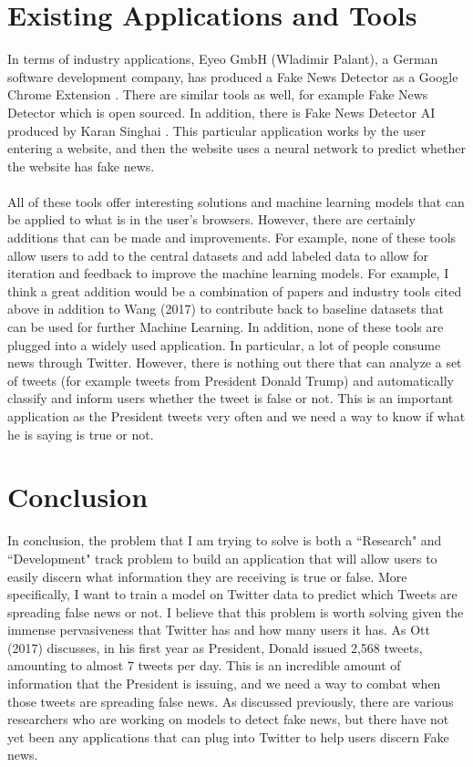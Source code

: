 \documentclass[12pt, final]{article}
\begin{document}
\section{Existing Applications and Tools}
In terms of industry applications, Eyeo GmbH (Wladimir Palant), a German software development company, has produced a Fake News Detector as a Google Chrome Extension \cite{Eyeo}. There are similar tools as well, for example Fake News Detector \cite{Fake} which is open sourced. In addition, there is Fake News Detector AI produced by Karan Singhai \cite{Singhai}. This particular application works by the user entering a website, and then the website uses a neural network to predict whether the website has fake news.
\\
\\
All of these tools offer interesting solutions and machine learning models that can be applied to what is in the user's browsers. However, there are certainly additions that can be made and improvements. For example, none of these tools allow users to add to the central datasets and add labeled data to allow for iteration and feedback to improve the machine learning models. For example, I think a great addition would be a combination of papers and industry tools cited above in addition to Wang (2017) \cite{Wang} to contribute back to baseline datasets that can be used for further Machine Learning. In addition, none of these tools are plugged into a widely used application. In particular, a lot of people consume news through Twitter. However, there is nothing out there that can analyze a set of tweets (for example tweets from President Donald Trump) and automatically classify and inform users whether the tweet is false or not. This is an important application as the President tweets very often and we need a way to know if what he is saying is true or not.

\section{Conclusion}
In conclusion, the problem that I am trying to solve is both a ``Research" and ``Development" track problem to build an application that will allow users to easily discern what information they are receiving is true or false. More specifically, I want to train a model on Twitter data to predict which Tweets are spreading false news or not. I believe that this problem is worth solving given the immense pervasiveness that Twitter has and how many users it has. As Ott (2017) \cite{Ott} discusses, in his first year as President, Donald issued 2,568 tweets, amounting to almost 7 tweets per day. This is an incredible amount of information that the President is issuing, and we need a way to combat when those tweets are spreading false news. As discussed previously, there are various researchers who are working on models to detect fake news, but there have not yet been any applications that can plug into Twitter to help users discern Fake news.
\end{document}
